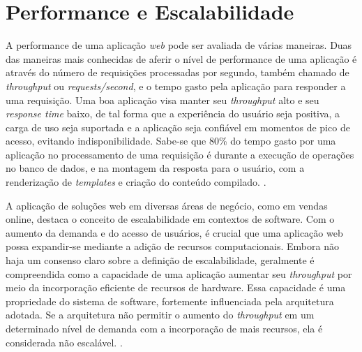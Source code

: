 \section{Performance e Escalabilidade}

A performance de uma aplicação \textit{web} pode ser avaliada de várias maneiras. Duas das maneiras mais conhecidas de aferir o nível de performance de uma aplicação é através do número de requisições processadas por segundo, também chamado de \textit{throughput} ou \textit{requests/second}, e o tempo gasto pela aplicação para responder a uma requisição. Uma boa aplicação visa manter seu \textit{throughput} alto e seu \textit{response time} baixo, de tal forma que a experiência do usuário seja positiva, a carga de uso seja suportada e a aplicação seja confiável em momentos de pico de acesso, evitando indisponibilidade. Sabe-se que 80\% do tempo gasto por uma aplicação no processamento de uma requisição é durante a execução de operações no banco de dados, e na montagem da resposta para o usuário, com a renderização de \textit{templates} e criação do conteúdo compilado. \cite{jugo2014analysis}.

A aplicação de soluções web em diversas áreas de negócio, como em vendas online, destaca o conceito de escalabilidade em contextos de software. Com o aumento da demanda e do acesso de usuários, é crucial que uma aplicação web possa expandir-se mediante a adição de recursos computacionais. Embora não haja um consenso claro sobre a definição de escalabilidade, geralmente é compreendida como a capacidade de uma aplicação aumentar seu \textit{throughput} por meio da incorporação eficiente de recursos de hardware. Essa capacidade é uma propriedade do sistema de software, fortemente influenciada pela arquitetura adotada. Se a arquitetura não permitir o aumento do \textit{throughput} em um determinado nível de demanda com a incorporação de mais recursos, ela é considerada não escalável. \cite{williams2004web}.